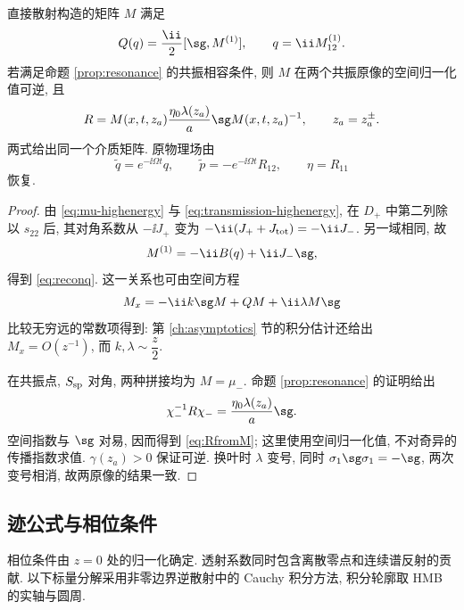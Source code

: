 \begin{proposition}[光场与介质重构]\label{prop:reconstruction}
直接散射构造的矩阵 $M$ 满足
\begin{equation}\label{eq:reconq}
Q(q)=\dfrac{\ii}{2}[\sg,M^{(1)}],\qquad q=\ii M^{(1)}_{12}.
\end{equation}
若满足命题 \ref{prop:resonance} 的共振相容条件, 则 $M$ 在两个共振原像的空间归一化值可逆, 且
\begin{equation}\label{eq:RfromM}
R=M(x,t,z_a)\dfrac{\eta_0\lambda(z_a)}{a}\sg M(x,t,z_a)^{-1},
\qquad z_a=z_a^\pm.
\end{equation}
两式给出同一个介质矩阵. 原物理场由
\begin{equation}\label{eq:original-fields}
\widetilde q=e^{-\ii\Omega t}q,\qquad
\widetilde p=-e^{-\ii\Omega t}R_{12},\qquad \eta=R_{11}
\end{equation}
恢复.
\end{proposition}
\begin{proof}
由 \eqref{eq:mu-highenergy} 与 \eqref{eq:transmission-highenergy}, 在 $D_+$ 中第二列除以 $s_{22}$ 后, 其对角系数从 $-\ii J_+$ 变为 $-\ii(J_++J_{\rm tot})=-\ii J_-$. 另一域相同, 故
\[
M^{(1)}=-\ii B(q)+\ii J_-\sg,
\]
得到 \eqref{eq:reconq}. 这一关系也可由空间方程
\begin{equation}\label{eq:Mspace}
M_x=-\ii k\sg M+QM+\ii\lambda M\sg
\end{equation}
比较无穷远的常数项得到: 第 \ref{ch:asymptotics} 节的积分估计还给出 $M_x=O(z^{-1})$, 而 $k,\lambda\sim\dfrac{z}{2}$.

在共振点, $S_{\rm sp}$ 对角, 两种拼接均为 $M=\mu_-$. 命题 \ref{prop:resonance} 的证明给出
\[
\chi_-^{-1}R\chi_-=\dfrac{\eta_0\lambda(z_a)}{a}\sg.
\]
空间指数与 $\sg$ 对易, 因而得到 \eqref{eq:RfromM}; 这里使用空间归一化值, 不对奇异的传播指数求值. $\gamma(z_a)>0$ 保证可逆. 换叶时 $\lambda$ 变号, 同时 $\sigma_1\sg\sigma_1=-\sg$, 两次变号相消, 故两原像的结果一致.
\end{proof}

\subsection{迹公式与相位条件}
相位条件由 $z=0$ 处的归一化确定. 透射系数同时包含离散零点和连续谱反射的贡献. 以下标量分解采用非零边界逆散射中的 Cauchy 积分方法\cite{Fan2022,ZhangFan2020}, 积分轮廓取 HMB 的实轴与圆周.

